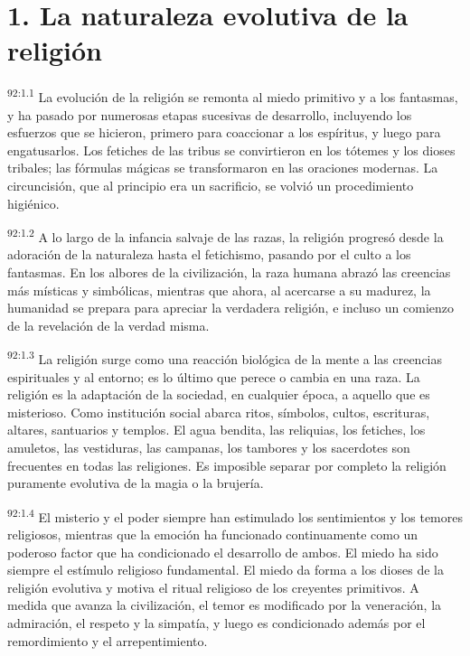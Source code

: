 \section*{1. La naturaleza evolutiva de la religión}
\par
\textsuperscript{92:1.1} La evolución de la religión se remonta al miedo primitivo y a los fantasmas, y ha pasado por numerosas etapas sucesivas de desarrollo, incluyendo los esfuerzos que se hicieron, primero para coaccionar a los espíritus, y luego para engatusarlos. Los fetiches de las tribus se convirtieron en los tótemes y los dioses tribales; las fórmulas mágicas se transformaron en las oraciones modernas. La circuncisión, que al principio era un sacrificio, se volvió un procedimiento higiénico.

\par
\textsuperscript{92:1.2} A lo largo de la infancia salvaje de las razas, la religión progresó desde la adoración de la naturaleza hasta el fetichismo, pasando por el culto a los fantasmas. En los albores de la civilización, la raza humana abrazó las creencias más místicas y simbólicas, mientras que ahora, al acercarse a su madurez, la humanidad se prepara para apreciar la verdadera religión, e incluso un comienzo de la revelación de la verdad misma.

\par
\textsuperscript{92:1.3} La religión surge como una reacción biológica de la mente a las creencias espirituales y al entorno; es lo último que perece o cambia en una raza. La religión es la adaptación de la sociedad, en cualquier época, a aquello que es misterioso. Como institución social abarca ritos, símbolos, cultos, escrituras, altares, santuarios y templos. El agua bendita, las reliquias, los fetiches, los amuletos, las vestiduras, las campanas, los tambores y los sacerdotes son frecuentes en todas las religiones. Es imposible separar por completo la religión puramente evolutiva de la magia o la brujería.

\par
\textsuperscript{92:1.4} El misterio y el poder siempre han estimulado los sentimientos y los temores religiosos, mientras que la emoción ha funcionado continuamente como un poderoso factor que ha condicionado el desarrollo de ambos. El miedo ha sido siempre el estímulo religioso fundamental. El miedo da forma a los dioses de la religión evolutiva y motiva el ritual religioso de los creyentes primitivos. A medida que avanza la civilización, el temor es modificado por la veneración, la admiración, el respeto y la simpatía, y luego es condicionado además por el remordimiento y el arrepentimiento.

